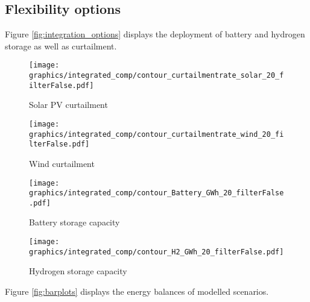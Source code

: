 

\newpage








\subsection{Flexibility options}
Figure \ref{fig:integration_options} displays the deployment of battery and hydrogen storage as well as curtailment.

\begin{figure*}[h] %
    \centering
    \begin{subfigure}[b]{0.45\linewidth}
        \centering
        \texttt{[image: graphics/integrated\_comp/contour\_curtailmentrate\_solar\_20\_filterFalse.pdf]}
        \caption{Solar PV curtailment}
        \label{fig:solar_curt}
    \end{subfigure}
    \hfill
    \begin{subfigure}[b]{0.45\linewidth}
        \centering
        \texttt{[image: graphics/integrated\_comp/contour\_curtailmentrate\_wind\_20\_filterFalse.pdf]}
        \caption{Wind curtailment}
        \label{fig:wind_curt}
    \end{subfigure}
    \hfill
    \begin{subfigure}[b]{0.45\linewidth}
        \centering
        \texttt{[image: graphics/integrated\_comp/contour\_Battery\_GWh\_20\_filterFalse.pdf]}
        \caption{Battery storage capacity}
        \label{fig:battery_cap}
    \end{subfigure}
    \hfill
    \begin{subfigure}[b]{0.45\linewidth}
        \centering
        \texttt{[image: graphics/integrated\_comp/contour\_H2\_GWh\_20\_filterFalse.pdf]}
        \caption{Hydrogen storage capacity}
        \label{fig:hystorage_cap}
    \end{subfigure}
    \hfill

    \caption{Curtailment rates and storage capacities}
    \label{fig:integration_options}
\end{figure*}

Figure \ref{fig:barplots} displays the energy balances of modelled scenarios.


